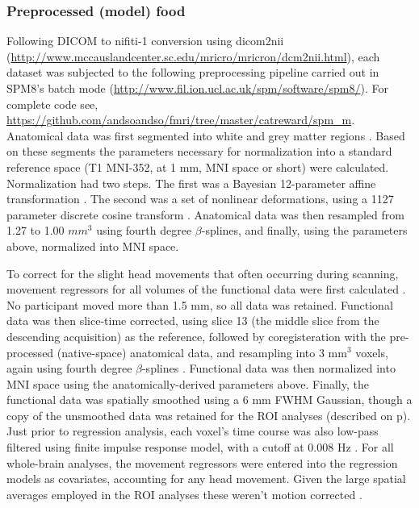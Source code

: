 \documentclass[doc,12pt]{apa}        %
\begin{document}
\subsubsection{Preprocessed (model) food}
\label{subsub:preprocessed}
Following DICOM to nifiti-1 conversion using dicom2nii (\url{http://www.mccauslandcenter.sc.edu/mricro/mricron/dcm2nii.html}), each dataset was subjected to the following preprocessing pipeline carried out in SPM8's batch mode (\url{http://www.fil.ion.ucl.ac.uk/spm/software/spm8/}).  For complete code see, \url{https://github.com/andsoandso/fmri/tree/master/catreward/spm\_m}.  Anatomical data was first segmented into white and grey matter regions \cite{Collignon:1995p9347}.  Based on these segments the parameters necessary for normalization into a standard reference space (T1 MNI-352, at 1 mm, MNI space or short) were calculated. Normalization had two steps.  The first was a Bayesian 12-parameter affine transformation \cite{Ashburner:1997p9348}.  The second was a set of nonlinear deformations, using a 1127 parameter discrete cosine transform \cite{Ashburner:1999p9350}.  Anatomical data was then resampled from 1.27 to 1.00 $mm^3$ using fourth degree $\beta$-splines, and finally, using the parameters above, normalized into MNI space.

To correct for the slight head movements that often occurring during scanning, movement regressors for all volumes of the functional data were first calculated \cite{Ashburner:1999p9350}.  No participant moved more than 1.5 mm, so all data was retained.  Functional data was then slice-time corrected, using slice 13 (the middle slice from the descending acquisition) as the reference, followed by coregisteration with the pre-processed (native-space) anatomical data, and resampling into 3 mm$^3$ voxels, again using fourth degree $\beta$-splines \cite{Collignon:1995p9347}.  Functional data was then normalized into MNI space using the anatomically-derived parameters above.  Finally, the functional data was spatially smoothed using a 6 mm FWHM Gaussian, though a copy of the unsmoothed data was retained for the ROI analyses (described on p\pageref{sub:regoins}).  Just prior to regression analysis, each voxel's time course was also low-pass filtered using finite impulse response model, with a cutoff at 0.008 Hz \cite{Kruggel:1999p9351}.  For all whole-brain analyses, the movement regressors were entered into the regression models as covariates, accounting for any head movement.  Given the large spatial averages employed in the ROI analyses these weren't motion corrected \cite{Poldrack:2007p8572}.
\end{document}
